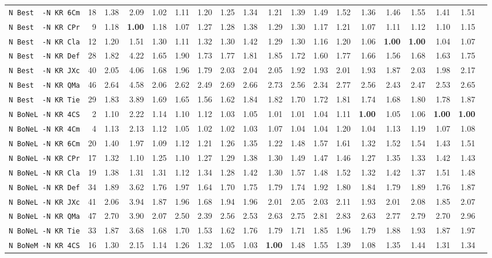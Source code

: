 \begin{tabular}{l | r @{~~} r | r@{~~}r@{~~}r@{~~}r@{~~}r@{~~}r@{~~}r@{~~}r@{~~}r@{~~}r@{~~}r@{~~}r@{~~}r@{~~}r@{~~}r@{~~}r|}
\verb+N Best  -N KR 6Cm+ & 18 & 1.38 & 2.09&1.02&1.11&1.20&1.25&1.34&1.21&1.39&1.49&1.52&1.36&1.46&1.55&1.41&1.51\\
\verb+N Best  -N KR CPr+ & 9 & 1.18 & \textbf{1.00}&1.18&1.07&1.27&1.28&1.38&1.29&1.30&1.17&1.21&1.07&1.11&1.12&1.10&1.15\\
\verb+N Best  -N KR Cla+ & 12 & 1.20 & 1.51&1.30&1.11&1.32&1.30&1.42&1.29&1.30&1.16&1.20&1.06&\textbf{1.00}&\textbf{1.00}&1.04&1.07\\
\verb+N Best  -N KR Def+ & 28 & 1.82 & 4.22&1.65&1.90&1.73&1.77&1.81&1.85&1.72&1.60&1.77&1.66&1.56&1.68&1.63&1.75\\
\verb+N Best  -N KR JXc+ & 40 & 2.05 & 4.06&1.68&1.96&1.79&2.03&2.04&2.05&1.92&1.93&2.01&1.93&1.87&2.03&1.98&2.17\\
\verb+N Best  -N KR QMa+ & 46 & 2.64 & 4.58&2.06&2.62&2.49&2.69&2.66&2.73&2.56&2.34&2.77&2.56&2.43&2.47&2.53&2.65\\
\verb+N Best  -N KR Tie+ & 29 & 1.83 & 3.89&1.69&1.65&1.56&1.62&1.84&1.82&1.70&1.72&1.81&1.74&1.68&1.80&1.78&1.87\\
\verb+N BoNeL -N KR 4CS+ & 2 & 1.10 & 2.22&1.14&1.10&1.12&1.03&1.05&1.01&1.01&1.04&1.11&\textbf{1.00}&1.05&1.06&\textbf{1.00}&\textbf{1.00}\\
\verb+N BoNeL -N KR 4Cm+ & 4 & 1.13 & 2.13&1.12&1.05&1.02&1.02&1.03&1.07&1.04&1.04&1.20&1.04&1.13&1.19&1.07&1.08\\
\verb+N BoNeL -N KR 6Cm+ & 20 & 1.40 & 1.97&1.09&1.12&1.21&1.26&1.35&1.22&1.48&1.57&1.61&1.32&1.52&1.54&1.43&1.51\\
\verb+N BoNeL -N KR CPr+ & 17 & 1.32 & 1.10&1.25&1.10&1.27&1.29&1.38&1.30&1.49&1.47&1.46&1.27&1.35&1.33&1.42&1.43\\
\verb+N BoNeL -N KR Cla+ & 19 & 1.38 & 1.31&1.31&1.12&1.34&1.28&1.42&1.30&1.57&1.48&1.52&1.32&1.42&1.37&1.51&1.48\\
\verb+N BoNeL -N KR Def+ & 34 & 1.89 & 3.62&1.76&1.97&1.64&1.70&1.75&1.79&1.74&1.92&1.80&1.84&1.79&1.89&1.76&1.87\\
\verb+N BoNeL -N KR JXc+ & 41 & 2.06 & 3.94&1.87&1.96&1.68&1.94&1.96&2.01&2.05&2.03&2.11&1.93&2.01&2.08&1.85&2.07\\
\verb+N BoNeL -N KR QMa+ & 47 & 2.70 & 3.90&2.07&2.50&2.39&2.56&2.53&2.63&2.75&2.81&2.83&2.63&2.77&2.79&2.70&2.96\\
\verb+N BoNeL -N KR Tie+ & 33 & 1.87 & 3.68&1.68&1.70&1.53&1.62&1.76&1.79&1.71&1.85&1.96&1.79&1.88&1.93&1.87&1.97\\
\verb+N BoNeM -N KR 4CS+ & 16 & 1.30 & 2.15&1.14&1.26&1.32&1.05&1.03&\textbf{1.00}&1.48&1.55&1.39&1.08&1.35&1.44&1.31&1.34\\

\end{tabular}
